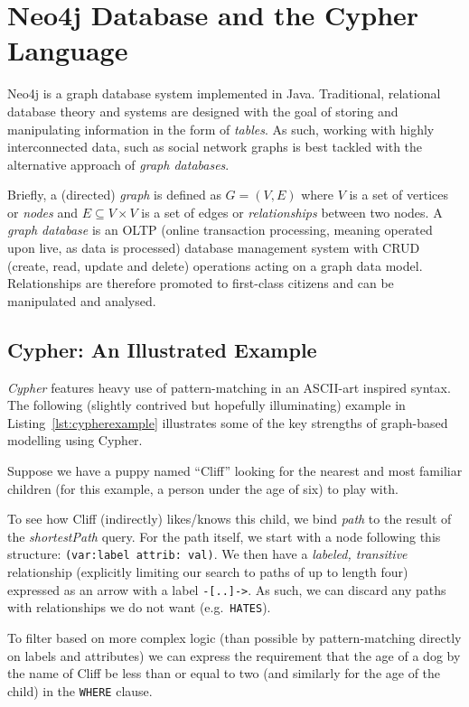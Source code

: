 \section{Neo4j Database and the Cypher Language}

Neo4j is a graph database system implemented in Java. Traditional, relational
database theory and systems are designed with the goal of storing and
manipulating information in the form of \emph{tables}. As such, working with
highly interconnected data, such as social network graphs is best tackled with
the alternative approach of \emph{graph databases}.

Briefly, a (directed) \emph{graph} is defined as $G = (V, E)$ where $V$ is a set
of vertices or \emph{nodes} and $E \subseteq V \times V$ is a set of edges or
\emph{relationships} between two nodes. A \emph{graph database} is an OLTP
(online transaction processing, meaning operated upon live, as data is
processed) database management system with CRUD (create, read, update and delete)
operations acting on a graph data model. Relationships are therefore promoted to
first-class citizens and can be manipulated and analysed.

\subsection*{Cypher: An Illustrated Example}

\emph{Cypher} features heavy use of pattern-matching in an ASCII-art inspired
syntax.  The following (slightly contrived but hopefully illuminating) example
in Listing~\ref{lst:cypherexample} illustrates some of the key strengths of
graph-based modelling using Cypher. 

Suppose we have a puppy named ``Cliff'' looking for the nearest and most
familiar children (for this example, a person under the age of six) to play
with.

To see how Cliff (indirectly) likes/knows this child, we bind \emph{path} to the
result of the \emph{shortestPath} query.  For the path itself, we start with a
node following this structure: \texttt{(var:label {attrib: val})}.
We then have a \emph{labeled, transitive} relationship (explicitly limiting our
search to paths of up to length four) expressed as an arrow with a label
\texttt{-[..]->}. As such, we can discard any paths with relationships we do not
want (e.g.\ \texttt{HATES}). 

To filter based on more complex logic (than possible by pattern-matching directly
on labels and attributes) we can express the requirement that the age of a dog by
the name of Cliff be less than or equal to two (and similarly for the age of the
child) in the \texttt{WHERE} clause.

